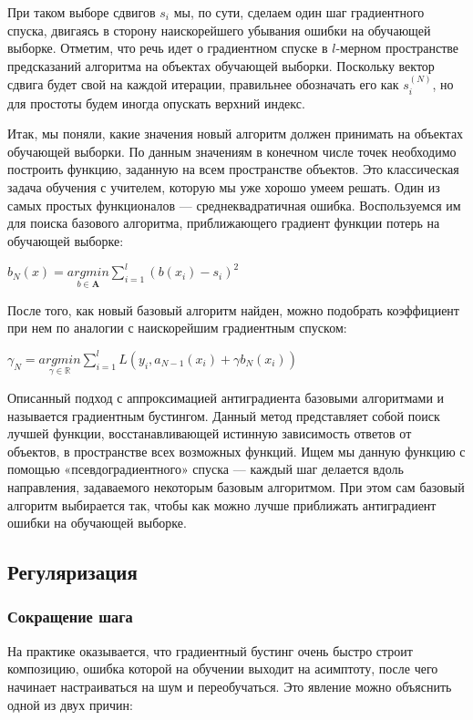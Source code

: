 \documentclass{article}
\begin{document}
При таком выборе сдвигов $s_i$ мы, по сути, сделаем один шаг градиентного спуска, двигаясь в сторону наискорейшего убывания ошибки на обучающей выборке. Отметим, что речь идет о градиентном спуске в $l$-мерном пространстве предсказаний алгоритма на объектах обучающей выборки. Поскольку вектор сдвига будет свой на
каждой итерации, правильнее обозначать его как $s_i^{(N)}$, но для простоты будем иногда
опускать верхний индекс.

Итак, мы поняли, какие значения новый алгоритм должен принимать на объектах обучающей выборки. По данным значениям в конечном числе точек необходимо построить функцию, заданную на всем пространстве объектов. Это классическая задача обучения с учителем, которую мы уже хорошо умеем решать. Один из самых простых функционалов --- среднеквадратичная ошибка. Воспользуемся им для поиска базового алгоритма, приближающего градиент функции потерь на обучающей выборке:


$b_N(x) = \underset{b\in\mathbf{A}}{argmin}\sum_{i=1}^{l} (b(x_i) - s_i)^2$

После того, как новый базовый алгоритм найден, можно подобрать коэффициент при нем по аналогии с наискорейшим градиентным спуском:

$\gamma_N = \underset{\gamma\in\mathbf{\mathbb{R}}}{argmin}\sum_{i=1}^{l} L(y_i,a_{N-1}(x_i) + \gamma b_N(x_i))$

Описанный подход с аппроксимацией антиградиента базовыми алгоритмами и называется градиентным бустингом. Данный метод представляет собой поиск лучшей функции, восстанавливающей истинную зависимость ответов от объектов, в пространстве всех возможных функций. Ищем мы данную функцию с помощью «псевдоградиентного» спуска --- каждый шаг делается вдоль направления, задаваемого некоторым базовым алгоритмом. При этом сам базовый алгоритм выбирается так, чтобы как можно лучше приближать антиградиент ошибки на обучающей выборке.

\subsection{Регуляризация}

\subsubsection{Сокращение шага}

На практике оказывается, что градиентный бустинг очень быстро строит композицию, ошибка которой на обучении выходит на асимптоту, после чего начинает настраиваться на шум и переобучаться. Это явление можно объяснить одной из двух причин:
\end{document}
